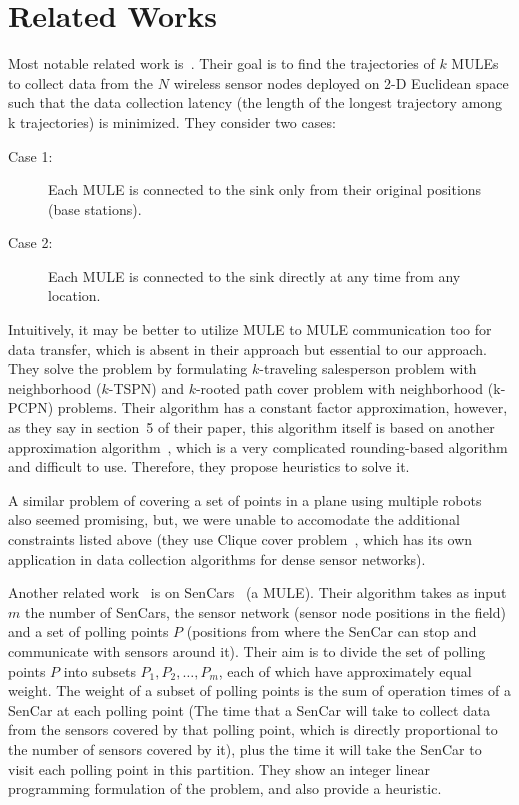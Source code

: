 \chapter{Related Works}
Most notable related work is~\cite{sim}. Their goal is to find the trajectories of $k$ MULEs to collect data from the $N$ wireless sensor nodes deployed on 2-D Euclidean space such that the data collection latency (the length of the longest trajectory among k trajectories) is minimized. They consider two cases: 
\begin{description}
\item[Case 1:] Each MULE is connected to the sink only from their original positions (base stations).
\item[Case 2:] Each MULE is connected to the sink directly at any time from any location.
\end{description}
Intuitively, it may be better to utilize MULE to MULE communication too for data transfer, which is absent in their approach but essential to our approach. They solve the problem by formulating $k$-traveling salesperson problem with neighborhood ($k$-TSPN) and $k$-rooted path cover problem with neighborhood (k-PCPN) problems. Their algorithm has a constant factor approximation, however, as they say in section~5 of their paper, this algorithm itself is based on another approximation algorithm~\cite{supportSim}, which is a very complicated rounding-based algorithm and difficult to use. Therefore, they propose heuristics to solve it.

A similar problem of covering a set of points in a plane using multiple robots~\cite{roboPlan} also seemed promising, but, we were unable to accomodate the additional constraints listed above (they use Clique cover problem~\cite{minCliquePartition}, which has its own application in data collection algorithms for dense sensor networks).

Another related work~\cite{sim4} is on SenCars~\cite{sencar} (a MULE). Their algorithm takes as input $m$ the number of SenCars, the sensor network (sensor node positions in the field) and a set of polling points $P$ (positions from where the SenCar can stop and communicate with sensors around it). Their aim is to divide the set of polling points $P$ into subsets $P_1, P_2, \ldots, P_m$, each of which have approximately equal weight. The weight of a subset of polling points is the sum of operation times of a SenCar at each polling point (The time that a SenCar will take to collect data from the sensors covered by that polling point, which is directly proportional to the number of sensors covered by it), plus the time it will take the SenCar to visit each polling point in this partition. They show an integer linear programming formulation of the problem, and also provide a heuristic.

